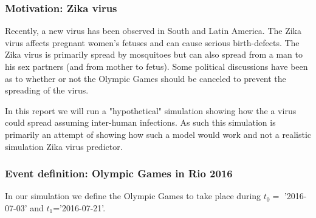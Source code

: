 \subsubsection{Motivation: Zika virus}
Recently, a new virus has been observed in South and Latin America. The Zika virus affects pregnant women's fetuses and can cause serious birth-defects. The Zika virus is primarily spread by mosquitoes but can also spread from a man to his sex partners (and from mother to fetus). Some political discussions have been as to whether or not the Olympic Games should be canceled to prevent the spreading of the virus. 

In this report we will run a "hypothetical" simulation showing how the a virus could spread assuming inter-human infections. As such this simulation is primarily an attempt of showing how such a model would work and not a realistic simulation Zika virus predictor.

\subsubsection{Event definition: Olympic Games in Rio 2016}
In our simulation we define the Olympic Games to take place during $t_0=$ '2016-07-03' and $t_1$='2016-07-21'.  